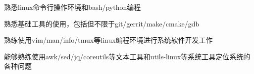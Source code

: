   \item 熟悉linux命令行操作环境和bash/python编程
  \item 熟悉基础工具的使用，包括但不限于git/gerrit/make/cmake/gdb
  \item 熟练使用vim/man/info/tmux等linux编程环境进行系统软件开发工作
  \item 能够熟练使用awk/sed/jq/coreutils等文本工具和utils-linux等系统工具定位系统的各种问题
